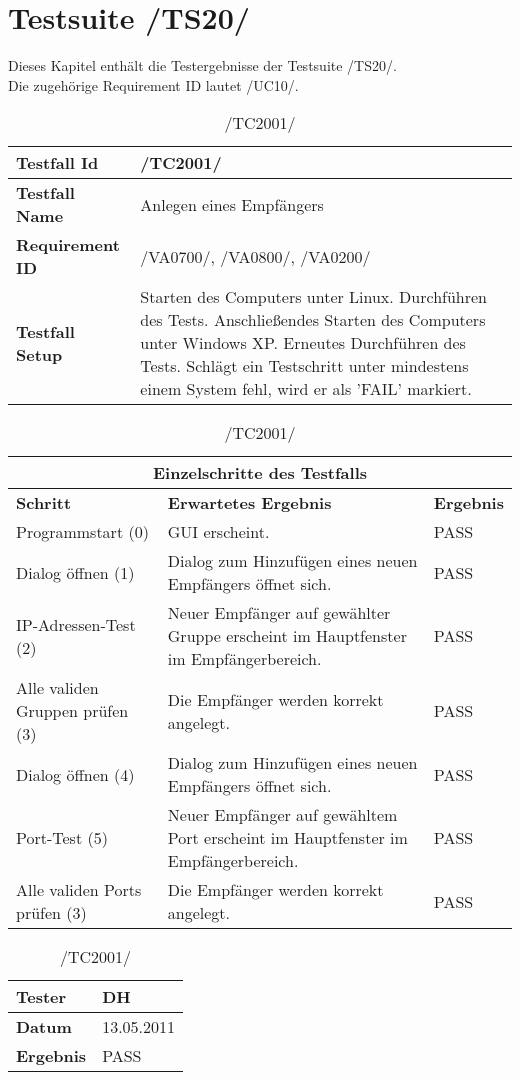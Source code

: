 \chapter{Testsuite /TS20/}
Dieses Kapitel enthält die Testergebnisse der Testsuite /TS20/.\\
Die zugehörige Requirement ID lautet /UC10/.

\begin{table}[h]
\caption{/TC2001/}
\label{tab:TC2001}
\begin{center}
\begin{tabular}{|p{3.5cm}|p{11cm}|}
\hline
\textbf{Testfall Id} & /TC2001/\\
\hline
\textbf{Testfall Name} & Anlegen eines Empfängers\\
\hline
\textbf{Requirement ID} & /VA0700/, /VA0800/, /VA0200/\\
\hline
\textbf{Testfall Setup} & Starten des Computers unter Linux. Durchführen des Tests.
Anschließendes Starten des Computers unter Windows XP. Erneutes Durchführen des Tests. Schlägt ein Testschritt unter mindestens einem System fehl, wird er als 'FAIL' markiert.\\
\hline
\end{tabular}
\begin{tabular}{|p{4cm}|p{7.8cm}|p{2.3cm}|}
\multicolumn{3}{|c|}{\textbf{Einzelschritte des Testfalls}} \\
\hline
\textbf{Schritt} & \textbf{Erwartetes Ergebnis} & \textbf{Ergebnis}\\
\hline
Programmstart (0) & GUI erscheint. & PASS\\
\hline
Dialog öffnen (1) & Dialog zum Hinzufügen eines neuen Empfängers öffnet sich. & PASS\\
\hline
IP-Adressen-Test (2) & Neuer Empfänger auf gewählter Gruppe erscheint im
Hauptfenster im Empfängerbereich. & PASS\\
\hline
Alle validen Gruppen prüfen (3) & Die Empfänger werden korrekt angelegt. & PASS\\
\hline
Dialog öffnen (4) & Dialog zum Hinzufügen eines neuen Empfängers öffnet sich. & PASS\\
\hline
Port-Test (5) & Neuer Empfänger auf gewähltem Port erscheint im
Hauptfenster im Empfängerbereich. & PASS\\
\hline
Alle validen Ports prüfen (3) & Die Empfänger werden korrekt angelegt. & PASS\\
\hline
\end{tabular}
\begin{tabular}{|p{3.5cm}|p{11cm}|}
\textbf{Tester} & DH\\
\hline
\textbf{Datum} & 13.05.2011\\
\hline
\textbf{Ergebnis} & PASS\\
\hline
\end{tabular}
\end{center}
\end{table}


